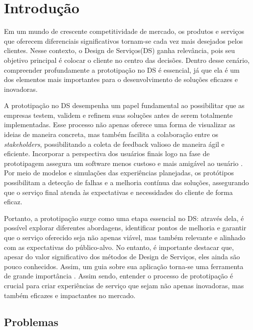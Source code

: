 \chapter[Introdução]{Introdução}


Em um mundo de crescente competitividade de mercado, os produtos e serviços que oferecem diferenciais significativos tornam-se cada vez mais desejados pelos clientes. Nesse contexto, o Design de Serviços(DS) ganha relevância, pois seu objetivo principal é colocar o cliente no centro das decisões. Dentro desse cenário, compreender profundamente a prototipação no DS é essencial, já que ela é um dos elementos mais importantes para o desenvolvimento de soluções eficazes e inovadoras.

A prototipação no DS desempenha um papel fundamental ao possibilitar que as empresas testem, validem e refinem suas soluções antes de serem totalmente implementadas. Esse processo não apenas oferece uma forma de visualizar as ideias de maneira concreta, mas também facilita a colaboração entre os \textit{stakeholders}, possibilitando a coleta de feedback valioso de maneira ágil e eficiente. Incorporar a perspectiva dos usuários finais logo na fase de prototipagem assegura um software menos custoso e mais amigável ao usuário \cite{Mattjus2023}. Por meio de modelos e simulações das experiências planejadas, os protótipos possibilitam a detecção de falhas e a melhoria contínua das soluções, assegurando que o serviço final atenda às expectativas e necessidades do cliente de forma eficaz.

Portanto, a prototipação surge como uma etapa essencial no DS: através dela, é possível explorar diferentes abordagens, identificar pontos de melhoria e garantir que o serviço oferecido seja não apenas viável, mas também relevante e alinhado com as expectativas do público-alvo.  No entanto, é importante destacar que, apesar do valor significativo dos métodos de Design de Serviços, eles ainda são pouco conhecidos. Assim, um guia sobre sua aplicação torna-se uma ferramenta de grande importância \cite{Mattjus2023}. Assim sendo, entender o processo de prototipação é crucial para criar experiências de serviço que sejam não apenas inovadoras, mas também eficazes e impactantes no mercado.


\section {Problemas}

